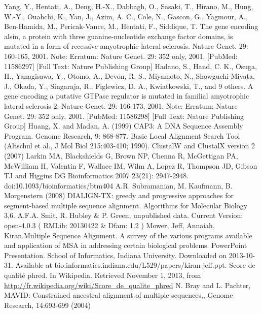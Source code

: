 \documentclass[10.9pt]{article} %
\begin{document}
\begin{thebibliography}{99}
{  Yang, Y., Hentati, A., Deng, H.-X., Dabbagh, O., Sasaki, T., Hirano, M., Hung, W.-Y., Ouahchi, K., Yan, J., Azim, A. C., Cole, N.,
  Gascon, G., Yagmour, A., Ben-Hamida, M., Pericak-Vance, M., Hentati, F., Siddique, T. The gene encoding alsin, a protein with three
  guanine-nucleotide exchange factor domains, is mutated in a form of recessive amyotrophic lateral sclerosis. Nature Genet. 29: 160-165,
  2001. Note: Erratum: Nature Genet. 29: 352 only, 2001. [PubMed: 11586297] [Full Text: Nature Publishing Group]
  Hadano, S., Hand, C. K., Osuga, H., Yanagisawa, Y., Otomo, A., Devon, R. S., Miyamoto, N., Showguchi-Miyata, J., Okada, Y., Singaraja,
  R., Figlewicz, D. A., Kwiatkowski, T., and 9 others. A gene encoding a putative GTPase regulator is mutated in familial amyotrophic
  lateral sclerosis 2. Nature Genet. 29: 166-173, 2001. Note: Erratum: Nature Genet. 29: 352 only, 2001. [PubMed: 11586298] [Full Text:
  Nature Publishing Group]
  Huang, X. and Madan, A. (1999) CAP3: A DNA Sequence Assembly Program. Genome Research, 9: 868-877.
  Basic Local Alignment Search Tool (Altschul et al., J Mol Biol 215:403-410; 1990).
  ClustalW and ClustalX version 2 (2007) Larkin MA, Blackshields G, Brown NP, Chenna R, McGettigan PA, McWilliam H, Valentin F, 
  Wallace IM, Wilm A, Lopez R, Thompson JD, Gibson TJ and Higgins DG Bioinformatics 2007 23(21): 2947-2948.
  doi:10.1093/bioinformatics/btm404 
  A.R. Subramanian, M. Kaufmann, B. Morgenstern (2008)
  DIALIGN-TX: greedy and progressive approaches for segment-based multiple sequence alignment.
  Algorithms for Molecular Biology 3,6.
 A.F.A. Smit, R. Hubley \& P. Green, unpublished data. Current Version: open-4.0.3 ( RMLib: 20130422 \& Dfam: 1.2 )
  Mower, Jeff, Annaiah, Kiran.Multiple Sequence Alignment. A survey of the various programs available and application of MSA in
  addressing certain biological problems. PowerPoint Presentation. School of Informatics, Indiana University. Downloaded on
  2013-10-31. Available at bio.informatics.indiana.edu/L529/papers/kiran-jeff.ppt.
  Score de qualité phred. In Wikipedia. Retrieved November 1, 2013, from \url{http://fr.wikipedia.org/wiki/Score_de_qualite_phred}
  N. Bray and L. Pachter, MAVID: Constrained ancestral alignment of multiple sequences,, Genome Research, 14:693-699 (2004)
}
\end{thebibliography}
\end{document}

